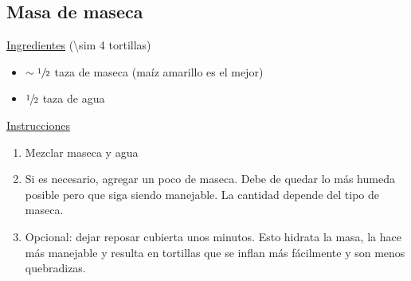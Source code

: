 \subsection{Masa de maseca}
\label{receta:masa-maseca}

\underline{Ingredientes} (\num{\sim 4} tortillas)
\begin{itemize}
\item $\sim\sfrac{1}{2}$ taza de maseca (maíz amarillo es el mejor)
\item $\sfrac{1}{2}$ taza de agua
\end{itemize}

\underline{Instrucciones}
\begin{enumerate}
\item Mezclar maseca y agua
\item Si es necesario, agregar un poco de maseca. Debe de quedar lo más humeda posible pero que siga siendo manejable. La cantidad depende del tipo de maseca.
\item Opcional: dejar reposar cubierta unos minutos. Esto hidrata la masa, la hace más manejable y resulta en tortillas que se inflan más fácilmente y son menos quebradizas.
\end{enumerate}